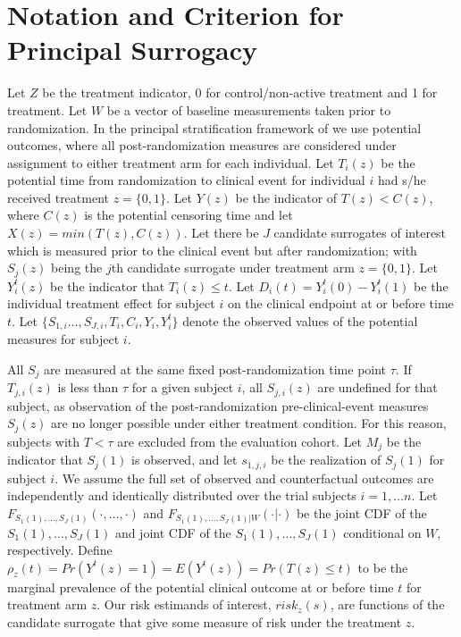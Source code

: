 \documentclass[times, doublespace]{simauth}
\begin{document}
\section{Notation and Criterion for Principal Surrogacy} \label{DEF}
Let $Z$ be the treatment indicator, 0 for control/non-active treatment and 1 for treatment. Let $W$ be a vector of baseline measurements taken prior to randomization. In the principal stratification framework of \citet{Frangakis02} we use potential outcomes, where all post-randomization measures are considered under assignment to either treatment arm for each individual. Let $T_i(z)$ be the potential time from randomization to clinical event for individual $i$ had s/he received treatment $z=\{0,1\}$. Let $Y(z)$ be the indicator of $T(z)<C(z)$, where $C(z)$ is the potential censoring time and let $X(z)=min(T(z),C(z))$. Let there be $J$ candidate surrogates of interest which is measured prior to the clinical event but after randomization; with $S_{j}(z)$ being the $j$th candidate surrogate under treatment arm $z=\{0,1\}$. Let $Y_{i}^{t}(z)$ be the indicator that $T_i(z)\leq t$. Let $D_i(t)=Y_{i}^{t}(0)-Y_{i}^{t}(1)$ be the individual treatment effect for subject $i$ on the clinical endpoint at or before time $t$. Let $\{S_{1,i}\ldots,S_{J,i}, T_i, C_i, Y_i, Y_{i}^{t} \}$ denote the observed values of the potential measures for subject $i$. 

All $S_j$ are measured at the same fixed post-randomization time point $\tau$. If $T_{j,i}(z)$ is less than $\tau$ for a given subject $i$, all $S_{j,i}(z)$ are undefined for that subject, as observation of the post-randomization pre-clinical-event measures $S_{j}(z)$ are no longer possible under either treatment condition. For this reason, subjects with $T< \tau$ are excluded from the evaluation cohort. Let $M_j$ be the indicator that $S_{j}(1)$ is observed, and let $s_{1,j,i}$ be the realization of $S_{j}(1)$ for subject $i$. We assume the full set of observed and counterfactual outcomes are independently and identically distributed over the trial subjects $i= 1, \ldots n$. Let $F_{S_1(1), \ldots, S_J(1)}(\cdot,\dots,\cdot)$ and $F_{S_1(1), \ldots, S_J(1)|W}(\cdot|\cdot)$ be the joint CDF of the $S_1(1), \ldots, S_J(1)$ and joint CDF of the $S_1(1), \ldots, S_J(1)$ conditional on $W$, respectively. Define $\rho_z(t)=Pr(Y^t(z)=1)=E(Y^t(z))=Pr(T(z)\leq t)$ to be the marginal prevalence of the potential clinical outcome at or before time $t$ for treatment arm $z$. Our risk estimands of interest, $risk_z(s)$, are functions of the candidate surrogate that give some measure of risk under the treatment $z$. 
\end{document}
